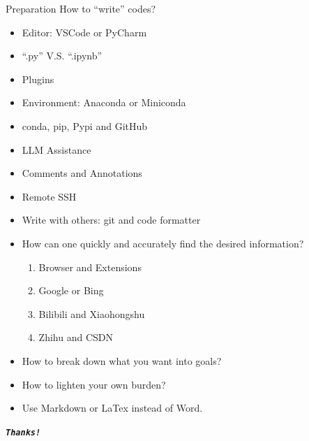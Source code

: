 \documentclass[UTF8, 16pt]{beamer}
\begin{document}
\begin{CJK*}{UTF8}{gbsn}
\begin{frame}{Preparation}
	How to ``write'' codes?
	\begin{itemize}
		\item Editor: VSCode or PyCharm
		\item ``.py'' V.S. ``.ipynb''
		\item Plugins
		\item Environment: Anaconda or Miniconda
		\item conda, pip, Pypi and GitHub
		\item LLM Assistance
		\item Comments and Annotations
		\item Remote SSH
		\item Write with others: git and code formatter
	\end{itemize}
\end{frame}

\begin{frame}{}
	\begin{itemize}
		\item How can one quickly and accurately find the desired information?
			\begin{enumerate}
				\item Browser and Extensions
				\item Google or Bing
				\item Bilibili and Xiaohongshu
				\item Zhihu and CSDN
			\end{enumerate}
		\item How to break down what you want into goals?
		\item How to lighten your own burden?
		\item Use Markdown or LaTex instead of Word.
	\end{itemize}
\end{frame}




\begin{frame}[allowframebreaks]%
	\begin{center}
		\Huge\textbf{\textit{\texttt{Thanks!}}}
	\end{center}
\end{frame}



\end{CJK*}
\end{document}
